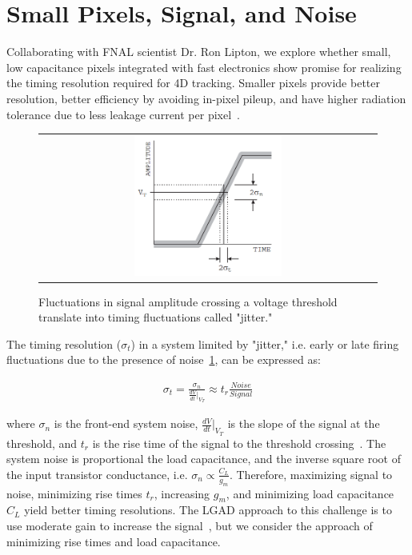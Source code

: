\section{Small Pixels, Signal, and Noise}
Collaborating with FNAL scientist Dr. Ron Lipton, we explore whether small, low capacitance pixels integrated with fast electronics show promise for realizing the timing resolution required for 4D tracking.
Smaller pixels provide better resolution, better efficiency by avoiding in-pixel pileup, and have higher radiation tolerance due to less leakage current per pixel~\cite{Garcia-Sciveres_2018}.

\begin{figure}[!htb]
  \begin{center}
    \begin{tabular}{c}
        \includegraphics[width=0.45\textwidth]{fig_FastTiming/Jitter.png}
    \end{tabular}
    \caption{Fluctuations in signal amplitude crossing a voltage threshold translate into timing fluctuations called "jitter."
            }            
    \label{Jitter}
  \end{center}
\end{figure}
The timing resolution ($\sigma_t$) in a system limited by "jitter," i.e. early or late firing fluctuations due to the presence of noise~\ref{Jitter}, can be expressed as:
\begin{linenomath*}
\begin{align}
\sigma_t =\frac{\sigma_n}{\frac{d V}{d t}\vert_{V_T}} \approx t_r\frac{Noise}{Signal}
\end{align}
\end{linenomath*}
where $\sigma_n$ is the front-end system noise, $\frac{d V}{d t}\vert_{V_T}$ is the slope of the signal at the threshold, and $t_r$ is the rise time of the signal to the threshold crossing~\cite{4336333}.
The system noise is proportional the load capacitance, and the inverse square root of the input transistor conductance, i.e. $\sigma_n \propto \frac{C_L}{g_m}$.
Therefore, maximizing signal to noise, minimizing rise times $t_r$, increasing $g_m$, and minimizing load capacitance $C_L$ yield better timing resolutions.
The LGAD approach to this challenge is to use moderate gain to increase the signal~\cite{SADROZINSKI2013226}, but we consider the approach of minimizing rise times and load capacitance.

